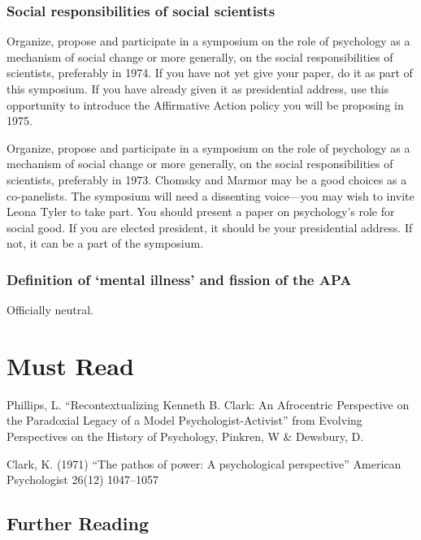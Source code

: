 \begin{refsection}
\subsubsection{Social responsibilities of social scientists}
\label{socialresponsibilitiesofsocialscientists}

\begin{writingtask}[Clark - 1974]\label{writingtask:clark2}
Organize, propose and participate in a symposium on the role of psychology as a mechanism of social change or more generally, on the social responsibilities of scientists, preferably in 1974.  If you have not yet give your paper, do it as part of this symposium. If you have already given it as presidential address, use this opportunity to introduce the Affirmative Action policy you will be proposing in 1975.
\end{writingtask}

Organize, propose and participate in a symposium on the role of psychology as a mechanism of social change or more generally, on the social responsibilities of scientists, preferably in 1973. Chomsky and Marmor may be a good choices as a co-panelists. The symposium will need a dissenting voice---you may wish to invite Leona Tyler to take part. You should present a paper on psychology's role for social good. If you are elected president, it should be your presidential address. If not, it can be a part of the symposium.

\subsubsection{Definition of ‘mental illness’ and fission of the APA}
\label{definitionof‘mentalillness’andfissionoftheapa}

Officially neutral.

\section{Must Read}
\label{mustread}

Phillips, L. “Recontextualizing Kenneth B. Clark: An Afrocentric Perspective on the Paradoxial Legacy of a Model Psychologist-Activist” from Evolving Perspectives on the History of Psychology, Pinkren, W \& Dewsbury, D.

Clark, K. (1971) “The pathos of power: A psychological perspective” American Psychologist 26(12) 1047--1057

\subsection{Further Reading}
\label{furtherreading}


\end{refsection}
